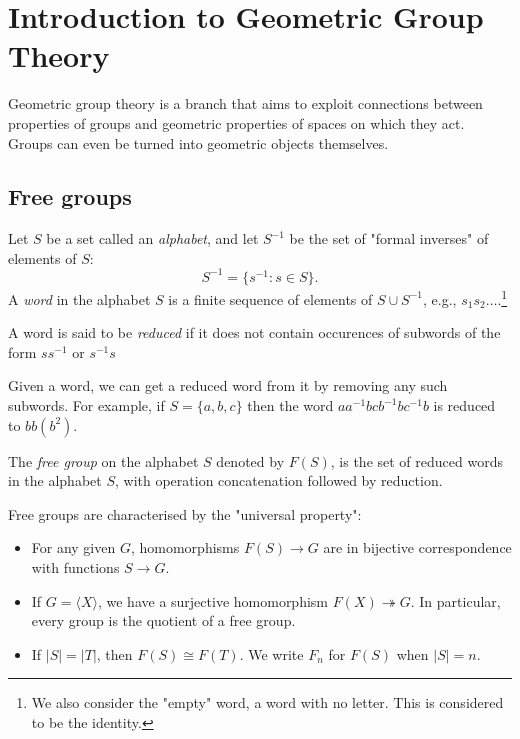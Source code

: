 \documentclass[a4paper]{article}
\begin{document}
\section{Introduction to Geometric Group Theory}
Geometric group theory is a branch that aims to exploit connections
between properties of groups and geometric properties of spaces on
which they act. Groups can even be turned into geometric objects themselves.
\subsection{Free groups}
Let $S$ be a set called an \textit{alphabet}, and let $ S^{-1} $ be
the set of "formal inverses" of elements of $S$:
\[
  S^{-1}=\{s^{-1}:s\in S\}.
\]
A \textit{word} in the alphabet $S$ is a finite sequence of elements
of $S\cup S^{-1}$, e.g., $s_1s_2\dots$.\footnote{We also consider the
"empty" word, a word with no letter. This is considered to be the identity.}

A word is said to be \textit{reduced} if it does not contain
occurences of subwords of the form $ss^{-1}$ or $s^{-1}s$

Given a word, we can get a reduced word from it by removing any such
subwords. For example, if $ S=\{a,b,c\} $ then the word $
aa^{-1}bcb^{-1}bc^{-1}b $ is reduced to $bb(b^2)$.
\begin{definition}
  The \textit{free group} on the alphabet $S$ denoted by $ F(S) $, is
  the set of reduced words in the alphabet $S$, with operation
  concatenation followed by reduction.
\end{definition}

Free groups are characterised by the "universal property":
\begin{proposition}
  \begin{itemize}
    \item For any given $G$, homomorphisms $F(S)\to G$ are in
      bijective correspondence with functions $ S \to G $.
    \item If $G=\langle X \rangle $, we have a surjective
      homomorphism $ F(X) \twoheadrightarrow G $. In particular,
      every group is the quotient of a free group.
    \item If $ |S|=|T| $, then $ F(S)\cong F(T) $. We write $ F_n $
      for $F(S)$ when $|S|=n$.
  \end{itemize}
\end{proposition}
\end{document}
